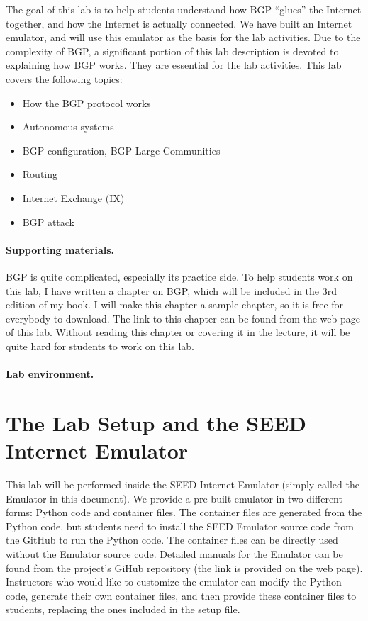 The goal of this lab is to help students understand how
BGP ``glues'' the Internet together, and how the Internet is actually
connected. We have built an Internet emulator, and will 
use this emulator as the basis for the lab activities. Due to the 
complexity of BGP, a significant portion of this lab description 
is devoted to explaining how BGP works. They are 
essential for the lab activities. 
This lab covers the following topics:
\begin{itemize}[noitemsep]
\item How the BGP protocol works
\item Autonomous systems
\item BGP configuration, BGP Large Communities 
\item Routing 
\item Internet Exchange (IX)
\item BGP attack
\end{itemize}


\paragraph{Supporting materials.}
BGP is quite complicated, especially its practice side.
To help students work on this lab, I have written a chapter on
BGP, which will be included in the 3rd edition of my book.
I will make this chapter a sample chapter, so it is free
for everybody to download. 
The link to this chapter can be found from the web page of this lab.
Without reading this chapter
or covering it in the lecture, it will be quite hard 
for students to work on this lab. 


\paragraph{Lab environment.} 
\seedenvironmentB
\nodependency



\section{The Lab Setup and the SEED Internet Emulator} 

This lab will be performed inside the SEED Internet Emulator (simply
called the Emulator in this document). 
We provide a pre-built emulator in two different forms: Python code
and container files. The container files are generated from
the Python code, but students need to install the SEED Emulator source 
code from the GitHub to run the Python code. The container files
can be directly used without the Emulator source code. 
Detailed manuals for the Emulator can be found from 
the project's GiHub repository (the link is provided on the web page).
Instructors who would like to customize the emulator can modify the Python
code, generate their own container files, and then provide these
container files to students, replacing the ones included in the 
setup file.


